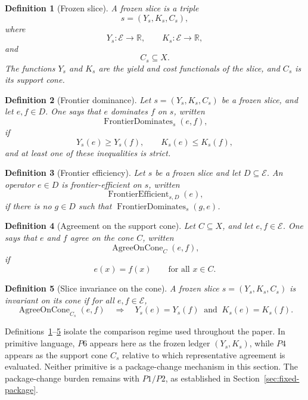\documentclass[11pt]{article}
\newtheorem{definition}{Definition}
\begin{document}
\begin{definition}[Frozen slice]\label{def:frozen-slice}
A frozen slice is a triple
\[
s=(Y_s,K_s,C_s),
\]
where
\[
Y_s\colon \mathcal{E}\to\mathbb{R},\qquad
K_s\colon \mathcal{E}\to\mathbb{R},
\]
and
\[
C_s\subseteq X.
\]
The functions \(Y_s\) and \(K_s\) are the yield and cost functionals of the slice, and \(C_s\) is its support cone.
\end{definition}

\begin{definition}[Frontier dominance]\label{def:frontier-dominance}
Let \(s=(Y_s,K_s,C_s)\) be a frozen slice, and let \(e,f\in D\). One says that \(e\) dominates \(f\) on \(s\), written
\[
\operatorname{FrontierDominates}_s(e,f),
\]
if
\[
Y_s(e)\ge Y_s(f),\qquad K_s(e)\le K_s(f),
\]
and at least one of these inequalities is strict.
\end{definition}

\begin{definition}[Frontier efficiency]\label{def:frontier-efficiency}
Let \(s\) be a frozen slice and let \(D\subseteq \mathcal{E}\). An operator \(e\in D\) is frontier-efficient on \(s\), written
\[
\operatorname{FrontierEfficient}_{s,D}(e),
\]
if there is no \(g\in D\) such that \(\operatorname{FrontierDominates}_s(g,e)\).
\end{definition}

\begin{definition}[Agreement on the support cone]\label{def:agree-on-cone}
Let \(C\subseteq X\), and let \(e,f\in\mathcal{E}\). One says that \(e\) and \(f\) agree on the cone \(C\), written
\[
\operatorname{AgreeOnCone}_C(e,f),
\]
if
\[
e(x)=f(x)\qquad\text{for all }x\in C.
\]
\end{definition}

\begin{definition}[Slice invariance on the cone]\label{def:slice-invariance}
A frozen slice \(s=(Y_s,K_s,C_s)\) is invariant on its cone if for all \(e,f\in\mathcal{E}\),
\[
\operatorname{AgreeOnCone}_{C_s}(e,f)
\quad\Longrightarrow\quad
Y_s(e)=Y_s(f)\ \text{ and }\ K_s(e)=K_s(f).
\]
\end{definition}

Definitions~\ref{def:frozen-slice}--\ref{def:slice-invariance} isolate the comparison regime used throughout the paper. In primitive language, \(P6\) appears here as the frozen ledger \((Y_s,K_s)\), while \(P4\) appears as the support cone \(C_s\) relative to which representative agreement is evaluated. Neither primitive is a package-change mechanism in this section. The package-change burden remains with \(P1/P2\), as established in Section~\ref{sec:fixed-package}.
\end{document}
